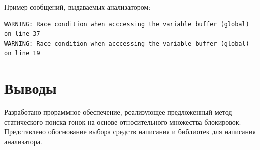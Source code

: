 Пример сообщений, выдаваемых анализатором:
\begin{verbatim}
WARNING: Race condition when acccessing the variable buffer (global) on line 37
WARNING: Race condition when acccessing the variable buffer (global) on line 19
\end{verbatim}

\section{Выводы}

Разработано прораммное обеспечение, реализующее предложенный метод статического поиска гонок на основе относительного множества блокировок. Представлено обоснование выбора средств написания и библиотек для написания анализатора.
